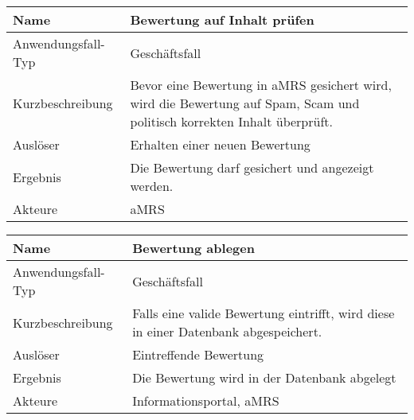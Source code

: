 \begin{table}[H]
    \centering
    \label{bewertungPruefen}
    \begin{tabularx}{\textwidth}{| l | X |}
        \hline
        Name               & Bewertung auf Inhalt prüfen                                                                                                   \\
        \hline
        Anwendungsfall-Typ & Geschäftsfall                                                                                                                 \\
        \hline
        Kurzbeschreibung   & Bevor eine Bewertung in \ac{aMRS} gesichert wird, wird die Bewertung auf Spam, Scam und politisch korrekten Inhalt überprüft. \\
        \hline
        Auslöser           & Erhalten einer neuen Bewertung                                                                                                \\
        \hline
        Ergebnis           & Die Bewertung darf gesichert und angezeigt werden.                                                                            \\
        \hline
        Akteure            & \ac{aMRS}                                                                                                                     \\
        \hline
    \end{tabularx}
\end{table}


\begin{table}[H]
    \centering
    \label{bewertungablegen}
    \begin{tabularx}{\textwidth}{| l | X |}
        \hline
        Name               & Bewertung ablegen                                                                   \\
        \hline
        Anwendungsfall-Typ & Geschäftsfall                                                                       \\
        \hline
        Kurzbeschreibung   & Falls eine valide Bewertung eintrifft, wird diese in einer Datenbank abgespeichert. \\
        \hline
        Auslöser           & Eintreffende Bewertung                                                              \\
        \hline
        Ergebnis           & Die Bewertung wird in der Datenbank abgelegt                                        \\
        \hline
        Akteure            & Informationsportal, \ac{aMRS}                                                       \\
        \hline
    \end{tabularx}
\end{table}

